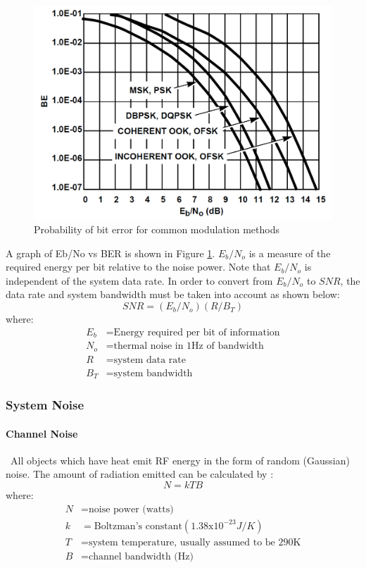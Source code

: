 \begin{figure}[h]
	\includegraphics[scale=0.3]{./sections/SatelliteDesign/images/BEvsSNR}
	\centering
	\caption{Probability of bit error for common modulation methods\cite{cubesatdimensions}}
	\label{BEvsSNR}
\end{figure}
A graph of Eb/No
vs BER is shown in Figure \ref{BEvsSNR}. $E_b/N_o$ is a measure of the
required energy per bit relative to the noise power. Note that
$E_b/N_o$ is independent of the system data rate. In order to
convert from $E_b/N_o$ to $SNR$, the data rate and system
bandwidth must be taken into account as shown below:
\begin{equation}
SNR=(E_b/N_o)(R/B_T)
\label{SNReq}
\end{equation}
where:
\begin{align*}
	E_b&= \text{Energy required per bit of information}\\
	N_o&= \text{thermal noise in 1Hz of bandwidth}\\
	R&= \text{system data rate}\\
	B_T&= \text{system bandwidth}
\end{align*}


\subsubsection{System Noise}
\paragraph{Channel Noise}
\
All objects which have heat emit RF energy in the form of random (Gaussian) noise. The amount of radiation emitted can be calculated by \cite{linkBudget}:
\begin{equation}
N=kTB
\label{noise}
\end{equation}
where:
\begin{align*}
	N&= \text{noise power (watts)}\\
	k&= \text{Boltzman's constant}(1.38\mathrm{x}10^{-23}J/K)\\
	T&= \text{system temperature, usually assumed to be 290K}\\
	B&= \text{channel bandwidth (Hz)}
\end{align*}

